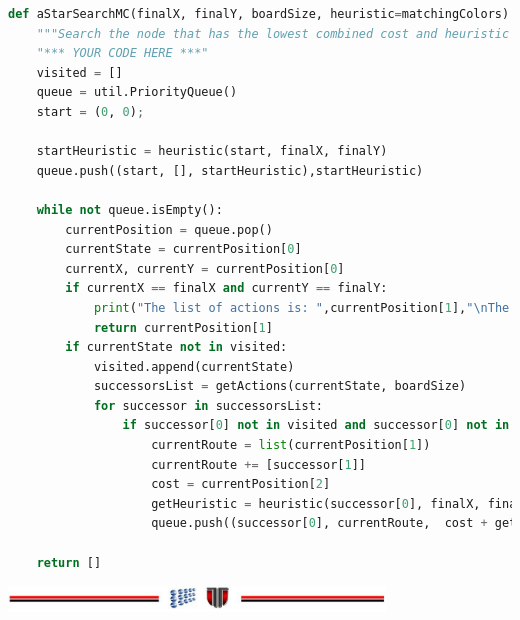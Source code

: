 \documentclass[a4paper,12pt]{report}
\begin{document}
\begin{lstlisting}[language=Python]
def aStarSearchMC(finalX, finalY, boardSize, heuristic=matchingColors):
    """Search the node that has the lowest combined cost and heuristic first."""
    "*** YOUR CODE HERE ***"
    visited = []
    queue = util.PriorityQueue()
    start = (0, 0);

    startHeuristic = heuristic(start, finalX, finalY)
    queue.push((start, [], startHeuristic),startHeuristic)

    while not queue.isEmpty():
        currentPosition = queue.pop()
        currentState = currentPosition[0]
        currentX, currentY = currentPosition[0]
        if currentX == finalX and currentY == finalY:
            print("The list of actions is: ",currentPosition[1],"\nThe cost is",currentPosition[2])
            return currentPosition[1]
        if currentState not in visited:
            visited.append(currentState)
            successorsList = getActions(currentState, boardSize)
            for successor in successorsList:
                if successor[0] not in visited and successor[0] not in [nod[0] for nod in queue.heap]:
                    currentRoute = list(currentPosition[1])
                    currentRoute += [successor[1]]
                    cost = currentPosition[2]
                    getHeuristic = heuristic(successor[0], finalX, finalY)
                    queue.push((successor[0], currentRoute,  cost + getHeuristic),cost + getHeuristic)

    return []
\end{lstlisting}
\vspace{2cm}
\begin{center}

\includegraphics[width=10cm]{fig/footer}
\end{center}
\end{document}
